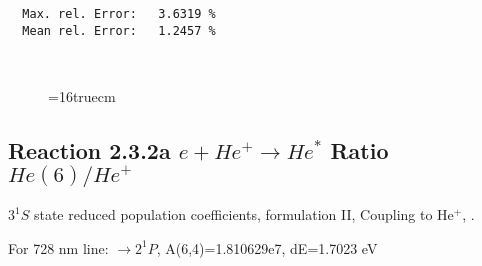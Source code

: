 \documentclass[12pt,dvipdfmx]{article}
\begin{document}
\begin{small}
\begin{verbatim}
  Max. rel. Error:   3.6319 %
  Mean rel. Error:   1.2457 %



\end{verbatim}\end{small}
\begin{figure} \label{2.2e}
\epsfxsize=16truecm
\end{figure}
\newpage


\subsection{
  Reaction 2.3.2a $e + He^+ \rightarrow He^*  $ Ratio $He(6)/He^+$
}

  $3^1S$ state
  reduced population coefficients, formulation II,
  Coupling to He$^+$, \cite{kn:Fujimoto}.

  For 728 nm line:  $\rightarrow 2^1P$, A(6,4)=1.810629e7, dE=1.7023 eV
\end{document}
